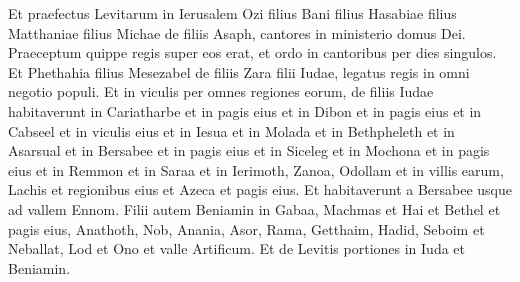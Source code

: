 \begin{biblechapter}
\verse Et praefectus Levitarum in Ierusalem Ozi filius Bani filius Hasabiae filius Matthaniae filius Michae de filiis Asaph, cantores in ministerio domus Dei.  
\verse Praeceptum quippe regis super eos erat, et ordo in cantoribus per dies singulos. 
\verse Et Phethahia filius Mesezabel de filiis Zara filii Iudae, legatus regis in omni negotio populi. 
\verse Et in viculis per omnes regiones eorum, de filiis Iudae habitaverunt in Cariatharbe et in pagis eius et in Dibon et in pagis eius et in Cabseel et in viculis eius 
\verse et in Iesua et in Molada et in Bethpheleth 
\verse et in Asarsual et in Bersabee et in pagis eius 
\verse et in Siceleg et in Mochona et in pagis eius 
\verse et in Remmon et in Saraa et in Ierimoth, 
\verse Zanoa, Odollam et in villis earum, Lachis et regionibus eius et Azeca et pagis eius. Et habitaverunt a Bersabee usque ad vallem Ennom. 
\verse Filii autem Beniamin in Gabaa, Machmas et Hai et Bethel et pagis eius, 
\verse Anathoth, Nob, Anania, 
\verse Asor, Rama, Getthaim, 
\verse Hadid, Seboim et Neballat, 
\verse Lod et Ono et valle Artificum. 
\verse Et de Levitis portiones in Iuda et Beniamin. 
\end{biblechapter}

